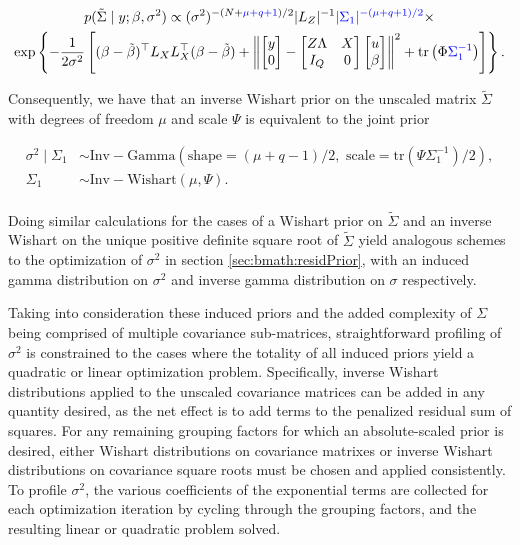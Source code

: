 \documentclass[article,shortnames]{jss}
\begin{document}
\begin{multline*}
  p(\tilde\Sigma \mid y; \beta, \sigma^2) \propto 
  (\sigma^2)^{-(N+{\color{blue}\mu+q+1})/2}
  |L_Z|^{-1}{\color{blue}|\Sigma_1|^{-(\mu + q + 1)/2}} \times \\
  \exp\left\{-\frac{1}{2\sigma^2}\left[(\beta - \tilde\beta)^\top
      L_XL_X^\top (\beta - \tilde\beta) + \left\|\begin{bmatrix} y \\
          0 \end{bmatrix} -
        \begin{bmatrix} Z\Lambda & X \\ I_Q & 0 \end{bmatrix}
        \begin{bmatrix} u \\ \beta \end{bmatrix}\right\|^2 +
      \mathrm{tr} \left(\Phi{\color{blue}\Sigma_1^{-1}}\right)\right]\right\}.
\end{multline*}

Consequently, we have that an inverse Wishart prior on the unscaled
matrix $\tilde\Sigma$ with degrees of freedom $\mu$ and scale $\Psi$
is equivalent to the joint prior

\begin{align*}
  \sigma^2 \mid \Sigma_1 & \sim \mathrm{Inv-Gamma}
  \left(\mathrm{shape} = (\mu + q - 1) / 2, \text{ scale} =
    \mathrm{tr}\left(\Psi\Sigma_1^{-1}\right) / 2\right), \\
  \Sigma_1 & \sim \mathrm{Inv-Wishart}(\mu, \Psi). \\
\end{align*}

Doing similar calculations for the cases of a Wishart prior on $\tilde\Sigma$ and an
inverse Wishart on the unique positive definite square root of $\tilde\Sigma$
yield analogous schemes to the optimization of $\sigma^2$ in
section \ref{sec:bmath:residPrior}, with an induced gamma distribution on
$\sigma^2$ and inverse gamma distribution on $\sigma$
respectively. 

Taking into consideration these induced priors and the added complexity
of $\Sigma$ being comprised of multiple covariance sub-matrices,
straightforward profiling of $\sigma^2$ is constrained to the cases where the
totality of all induced priors yield a quadratic or linear optimization
problem. Specifically, inverse Wishart distributions applied to the
unscaled covariance matrices can be added in any quantity
desired, as the net effect is to add terms to the penalized residual
sum of squares. For any remaining grouping factors for which an
absolute-scaled prior is desired, either Wishart distributions on covariance
matrixes or inverse Wishart distributions on covariance square roots
must be chosen and applied consistently. To profile $\sigma^2$, the
various coefficients of the exponential terms are collected for each
optimization iteration by cycling through the grouping factors, and
the resulting linear or quadratic problem solved.
\end{document}
